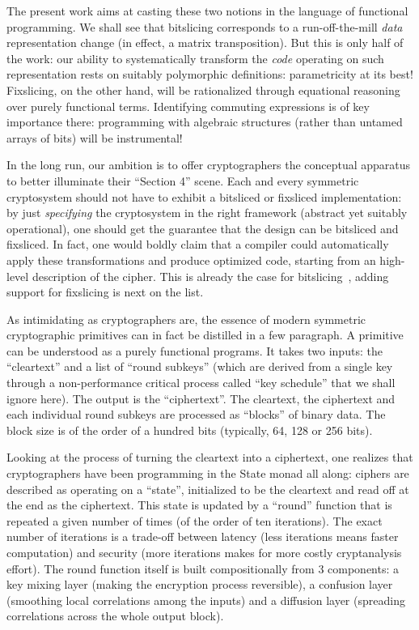\documentclass[draft,english]{jflart}
\begin{document}
The present work aims at casting these two notions in the language of
functional programming. We shall see that bitslicing corresponds to a
run-off-the-mill \emph{data} representation change (in effect, a
matrix transposition). But this is only half of the work: our ability
to systematically transform the \emph{code} operating on such
representation rests on suitably polymorphic definitions:
parametricity at its best! Fixslicing, on the other hand, will be
rationalized through equational reasoning over purely functional
terms. Identifying commuting expressions is of key importance there:
programming with algebraic structures (rather than untamed arrays of
bits) will be instrumental!

In the long run, our ambition is to offer cryptographers the
conceptual apparatus to better illuminate their ``Section 4'' scene.
Each and every symmetric cryptosystem should not have to exhibit a
bitsliced or fixsliced implementation: by just \emph{specifying} the
cryptosystem in the right framework (abstract yet suitably
operational), one should get the guarantee that the design can be
bitsliced and fixsliced. In fact, one would boldly claim that a
compiler could automatically apply these transformations and produce
optimized code, starting from an high-level description of the cipher.
This is already the case for bitslicing~\citep{mercadier:PhD}, adding support
for fixslicing is next on the list.


As intimidating as cryptographers are, the essence of modern symmetric
cryptographic primitives can in fact be distilled in a few paragraph. A
primitive can be understood as a purely functional programs. It takes
two inputs: the ``cleartext'' and a list of ``round subkeys''
(which are derived from a single key through a non-performance
critical process called ``key schedule'' that we shall ignore here).
The output is the ``ciphertext''. The cleartext, the ciphertext and
each individual round subkeys are processed as ``blocks'' of binary
data. The block size is of the order of a hundred bits (typically, 64, 128
or 256 bits).

Looking at the process of turning the cleartext into a ciphertext, one
realizes that cryptographers have been programming in the State monad
all along: ciphers are described as operating on a ``state'',
initialized to be the cleartext and read off at the end as the
ciphertext. This state is updated by a ``round'' function that is
repeated a given number of times (of the order of ten iterations). The
exact number of iterations is a trade-off between latency (less
iterations means faster computation) and security (more iterations
makes for more costly cryptanalysis effort). The round function itself
is built compositionally from 3 components: a key mixing layer (making
the encryption process reversible), a confusion layer (smoothing local
correlations among the inputs) and a diffusion layer (spreading
correlations across the whole output block).
\end{document}
